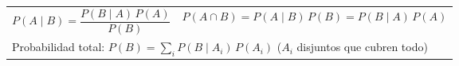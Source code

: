\begin{center}
\renewcommand{\arraystretch}{2.2}\setlength{\tabcolsep}{10pt}
\begin{tabular}{ll}
	$P(A \mid B) = \dfrac{P(B \mid A)\,P(A)}{P(B)}$ & $P(A \cap B) = P(A \mid B)\,P(B) = P(B \mid A)\,P(A)$ \\
	\multicolumn{2}{l}{Probabilidad total: \; $P(B) = \sum_i P(B \mid A_i)\,P(A_i)$ \quad ($A_i$ disjuntos que cubren todo)} \\
\end{tabular}
\end{center}
